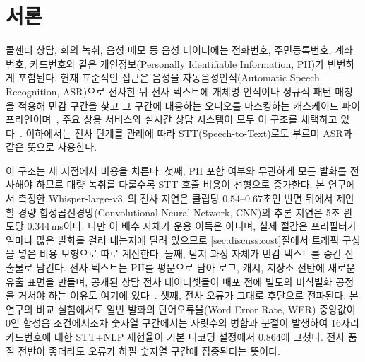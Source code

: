 \documentclass[10pt,twocolumn]{article}
\begin{document}
\section{서론}\label{sec:intro}

콜센터 상담, 회의 녹취, 음성 메모 등 음성 데이터에는 전화번호, 주민등록번호, 계좌번호,
카드번호와 같은 개인정보(Personally Identifiable Information, PII)가 빈번하게 포함된다.
현재 표준적인 접근은 음성을 자동음성인식(Automatic Speech Recognition, ASR)으로 전사한 뒤
전사 텍스트에 개체명 인식이나 정규식 패턴 매칭을 적용해 민감 구간을 찾고 그 구간에
대응하는 오디오를 마스킹하는 캐스케이드 파이프라인이며~\cite{cohn2019audiodeid}, 주요 상용
서비스와 실시간 상담 시스템이 모두 이 구조를 채택하고 있다~\cite{azurepii,gouvea2023trustera}.
이하에서는 전사 단계를 관례에 따라 STT(Speech-to-Text)로도 부르며 ASR과 같은 뜻으로
사용한다.

이 구조는 세 지점에서 비용을 치른다. 첫째, PII 포함 여부와 무관하게 모든 발화를 전사해야
하므로 대량 녹취를 다룰수록 STT 호출 비용이 선형으로 증가한다. 본 연구에서 측정한
Whisper-large-v3~\cite{radford2023whisper}의 전사 지연은 클립당 $0.54$--$0.67$초인 반면
뒤에서 제안할 경량 합성곱신경망(Convolutional Neural Network, CNN)의 추론 지연은 5초 윈도당
$0.344$\,ms이다. 다만 이 배수 자체가 운용 이득은 아니며, 실제 절감은 프리필터가 얼마나 많은
발화를 걸러 내는지에 달려 있으므로 \ref{sec:discuss:cost}절에서 트래픽 구성을 넣은 비용
모형으로 따로 계산한다. 둘째, 탐지 과정 자체가 민감 텍스트를 중간 산출물로 남긴다. 전사
텍스트는 PII를 평문으로 담아 로그, 캐시, 저장소 전반에 새로운 유출 표면을 만들며, 공개된
상담 전사 데이터셋들이 배포 전에 별도의 비식별화 공정을 거쳐야 하는 이유도 여기에
있다~\cite{dao2025callcenter}. 셋째, 전사 오류가 그대로 후단으로 전파된다. 본 연구의 비교
실험에서도 일반 발화의 단어오류율(Word Error Rate, WER) 중앙값이 0인 합성음 조건에서조차
숫자열 구간에서는 자릿수의 병합과 분절이 발생하여 16자리 카드번호에 대한 STT+NLP 재현율이 기본 디코딩 설정에서 $0.864$에 그쳤다. 전사 품질 전반이 좋더라도 오류가 하필 숫자열 구간에 집중된다는 뜻이다.
\end{document}
